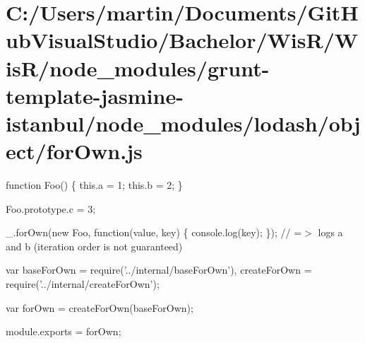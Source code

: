 \hypertarget{_c_1_2_users_2martin_2_documents_2_git_hub_visual_studio_2_bachelor_2_wis_r_2_wis_r_2node_modulea9edb281c3382106b33d895e432cc9ca}{}\section{C\+:/\+Users/martin/\+Documents/\+Git\+Hub\+Visual\+Studio/\+Bachelor/\+Wis\+R/\+Wis\+R/node\+\_\+modules/grunt-\/template-\/jasmine-\/istanbul/node\+\_\+modules/lodash/object/for\+Own.\+js}
function Foo() \{ this.\+a = 1; this.\+b = 2; \}

Foo.\+prototype.\+c = 3;

\+\_\+.\+for\+Own(new Foo, function(value, key) \{ console.\+log(key); \}); // =$>$ logs \textquotesingle{}a\textquotesingle{} and \textquotesingle{}b\textquotesingle{} (iteration order is not guaranteed)


\begin{DoxyCodeInclude}
var baseForOwn = require(\textcolor{stringliteral}{'../internal/baseForOwn'}),
    createForOwn = require(\textcolor{stringliteral}{'../internal/createForOwn'});

var forOwn = createForOwn(baseForOwn);

module.exports = forOwn;
\end{DoxyCodeInclude}
 